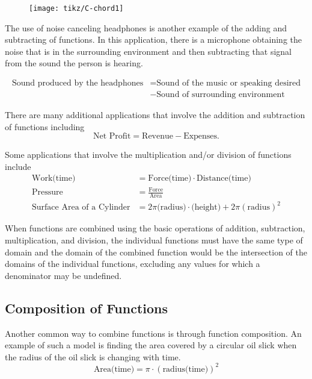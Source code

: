 \documentclass[
]{book}
\theoremstyle{definition}
\theoremstyle{definition}
\theoremstyle{definition}
\theoremstyle{remark}
\begin{document}
\begin{figure}

{\centering \texttt{[image: tikz/C-chord1]} 

}

\end{figure}

The use of noise canceling headphones is another example of the adding and subtracting of functions. In this application, there is a microphone obtaining the noise that is in the surrounding environment and then subtracting that signal from the sound the person is hearing.

\begin{align*}
\mbox{Sound produced by the headphones} &= \mbox{Sound of the music or speaking desired} \\
& -\mbox{Sound of surrounding environment}
\end{align*}

There are many additional applications that involve the addition and subtraction of functions including
\[\mbox{Net Profit} = \mbox{Revenue} -\mbox{Expenses}.\]

Some applications that involve the multiplication and/or division of functions include
\begin{align*}
    \mbox{Work(time)} &= \mbox{Force(time)} \cdot \mbox{Distance(time)} \\
    \mbox{Pressure} &= \frac{\mbox{Force}}{\mbox{Area}} \\
    \mbox{Surface Area of a Cylinder} &= 2\pi \mbox{(radius)}\cdot \mbox{(height)} + 2 \pi (\mbox{radius})^2 
\end{align*}

When functions are combined using the basic operations of addition, subtraction, multiplication, and division, the individual functions must have the same type of domain and the domain of the combined function would be the intersection of the domains of the individual functions, excluding any values for which a denominator may be undefined.

\hypertarget{composition-of-functions}{%
\subsection{Composition of Functions}\label{composition-of-functions}}

Another common way to combine functions is through function composition. An example of such a model is finding the area covered by a circular oil slick when the radius of the oil slick is changing with time.
\[\mbox{Area(time)} = \pi \cdot \left( \mbox{radius(time)} \right)^2\]
\end{document}
